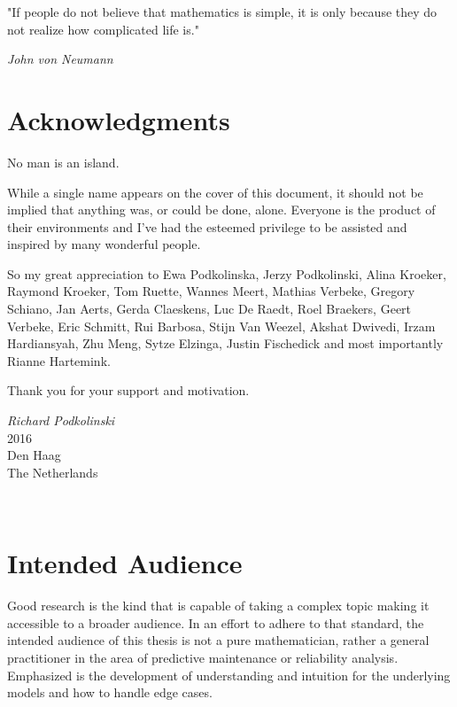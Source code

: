 \begin{displayquote}
"If people do not believe that mathematics is simple, it is only because they do not realize how complicated life is." 
\end{displayquote}

\begin{flushright}
\textit{John von Neumann}
\end{flushright}


\newpage
\section*{Acknowledgments}

No man is an island.

While a single name appears on the cover of this document, it should not be implied that anything was, or could be done, alone. Everyone is the product of their environments and I've had the esteemed privilege to be assisted and inspired by many wonderful people. 

So my great appreciation to Ewa Podkolinska, Jerzy Podkolinski, Alina Kroeker, Raymond Kroeker, Tom Ruette, Wannes Meert, Mathias Verbeke, Gregory Schiano, Jan Aerts, Gerda Claeskens, Luc De Raedt, Roel Braekers, Geert Verbeke, Eric Schmitt, Rui Barbosa, Stijn Van Weezel, Akshat Dwivedi, Irzam Hardiansyah, Zhu Meng, Sytze Elzinga, Justin Fischedick and most importantly Rianne Hartemink.

Thank you for your support and motivation. 

\begin{flushright}
\textit{Richard Podkolinski}
\\
2016 
\\
Den Haag
\\
The Netherlands
\end{flushright}
\\

\section*{Intended Audience}

Good research is the kind that is capable of taking a complex topic making it accessible to a broader audience. In an effort to adhere to that standard, the intended audience of this thesis is not a pure mathematician, rather a general practitioner in the area of predictive maintenance or reliability analysis. Emphasized is the development of understanding and intuition for the underlying models and how to handle edge cases. 

